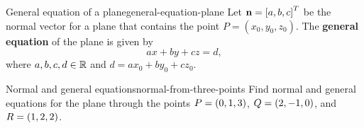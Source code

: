 \begin{definition}{General equation of a plane}{general-equation-plane}
  Let $\mbox{\bf n} = \left[a,b,c\right]^T$ be the normal vector for a plane that
  contains the point $P = (x_0, y_0, z_0)$. The \textbf{general
    equation}%
   of the plane is given by
  \[
    ax + by + cz = d,
  \]
  where $a,b,c,d \in \mathbb{R}$ and $d = ax_0 + by_0 + cz_0$.
\end{definition}

\begin{example}{Normal and general equations}{normal-from-three-points}
  Find normal and general equations for the plane through the points
  $P = \left(0,1,3\right)$, $Q=\left(2,-1,0\right)$, and $R=\left(1,2,2\right)$.
\end{example}

